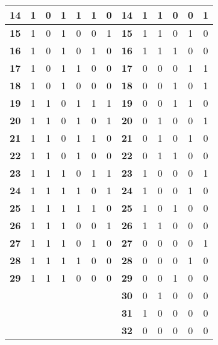 \documentclass[oneside]{article}
\begin{document}
\begin{center}
\begin{tabular}{|r|c|c|c|c|c|c||r|c|c|c|c|c|}
\textbf{14}&  1  &    0    &  1  &  1  &    1     &     0    &\textbf{14}&  1  &     1    &      0     &  0  &  1   \\ \hline
\textbf{15}&  1  &    0    &  1  &  0  &    0     &     1    &\textbf{15}&  1  &     1    &      0     &  1  &  0   \\ \hline
\textbf{16}&  1  &    0    &  1  &  0  &    1     &     0    &\textbf{16}&  1  &     1    &      1     &  0  &  0   \\ \hline
\textbf{17}&  1  &    0    &  1  &  1  &    0     &     0    &\textbf{17}&  0  &     0    &      0     &  1  &  1   \\ \hline
\textbf{18}&  1  &    0    &  1  &  0  &    0     &     0    &\textbf{18}&  0  &     0    &      1     &  0  &  1   \\ \hline
\textbf{19}&  1  &    1    &  0  &  1  &    1     &     1    &\textbf{19}&  0  &     0    &      1     &  1  &  0   \\ \hline
\textbf{20}&  1  &    1    &  0  &  1  &    0     &     1    &\textbf{20}&  0  &     1    &      0     &  0  &  1   \\ \hline
\textbf{21}&  1  &    1    &  0  &  1  &    1     &     0    &\textbf{21}&  0  &     1    &      0     &  1  &  0   \\ \hline
\textbf{22}&  1  &    1    &  0  &  1  &    0     &     0    &\textbf{22}&  0  &     1    &      1     &  0  &  0   \\ \hline
\textbf{23}&  1  &    1    &  1  &  0  &    1     &     1    &\textbf{23}&  1  &     0    &      0     &  0  &  1   \\ \hline
\textbf{24}&  1  &    1    &  1  &  1  &    0     &     1    &\textbf{24}&  1  &     0    &      0     &  1  &  0   \\ \hline
\textbf{25}&  1  &    1    &  1  &  1  &    1     &     0    &\textbf{25}&  1  &     0    &      1     &  0  &  0   \\ \hline
\textbf{26}&  1  &    1    &  1  &  0  &    0     &     1    &\textbf{26}&  1  &     1    &      0     &  0  &  0   \\ \hline
\textbf{27}&  1  &    1    &  1  &  0  &    1     &     0    &\textbf{27}&  0  &     0    &      0     &  0  &  1   \\ \hline
\textbf{28}&  1  &    1    &  1  &  1  &    0     &     0    &\textbf{28}&  0  &     0    &      0     &  1  &  0   \\ \hline
\textbf{29}&  1  &    1    &  1  &  0  &    0     &     0    &\textbf{29}&  0  &     0    &      1     &  0  &  0   \\ \hline
           &     &         &     &     &          &          &\textbf{30}&  0  &     1    &      0     &  0  &  0   \\ \hline
           &     &         &     &     &          &          &\textbf{31}&  1  &     0    &      0     &  0  &  0   \\ \hline
           &     &         &     &     &          &          &\textbf{32}&  0  &     0    &      0     &  0  &  0   \\ \hline
\end{tabular}


\end{center}
\end{document}
